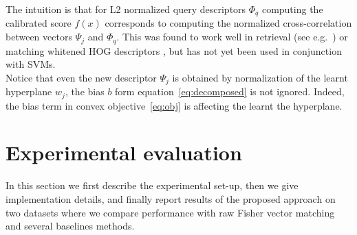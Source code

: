 \documentclass[10pt,twocolumn,letterpaper]{article}
\begin{document}
      \textcolor{petr}{%
         The intuition is that for L2 normalized query descriptors $\Phi_q$ computing the calibrated score $f(x)$ corresponds to computing the normalized cross-correlation between vectors $\Psi_j$ and $\Phi_q$. This was found to work well in retrieval (see e.g.~\cite{Sivic03}) or matching whitened HOG descriptors \cite{Gharbi12, Hariharan12}, but has not yet been used in conjunction with SVMs. 
         \\
         Notice that even the new descriptor $\Psi_j$ is obtained by normalization of the learnt hyperplane $w_j$, the bias $b$ form equation~\eqref{eq:decomposed} is not ignored. Indeed, the bias term in convex objective~\eqref{eq:obj} is affecting the learnt the hyperplane.
      }



\section{Experimental evaluation}
\label{sec:exp}
   In this section we first describe the experimental set-up, then we give implementation details, and finally report results of the proposed approach on two datasets where we compare performance with raw Fisher vector matching and several baselines methods. 
\end{document}
